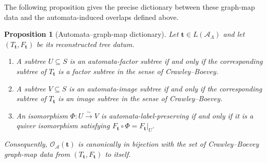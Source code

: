 \documentclass[11pt,a4paper]{amsart}
\theoremstyle{definition}
\theoremstyle{plain}
\newtheorem{proposition}[definition]{Proposition}
\theoremstyle{remark}
\numberwithin{equation}{section}
\begin{document}
The following proposition gives the precise dictionary between these graph-map data and the automata-induced overlaps defined above.

\begin{proposition}[Automata--graph-map dictionary]\label{prop:automata-graph-map-dictionary}
Let $\mathbf t\in L(\mathcal A_\Lambda)$ and let $(T_{\mathbf t},F_{\mathbf t})$ be its reconstructed tree datum.

\begin{enumerate}[label=\textup{(\roman*)}]
\item A subtree $U\subseteq S$ is an automata-factor subtree if and only if the corresponding subtree of $T_{\mathbf t}$ is a factor subtree in the sense of Crawley--Boevey.
\item A subtree $V\subseteq S$ is an automata-image subtree if and only if the corresponding subtree of $T_{\mathbf t}$ is an image subtree in the sense of Crawley--Boevey.
\item An isomorphism $\Phi:U\xrightarrow{\sim}V$ is automata-label-preserving if and only if it is a quiver isomorphism satisfying
$
F_{\mathbf t}\circ\Phi=F_{\mathbf t}|_U.
$
\end{enumerate}

Consequently, $\mathscr O_{\mathcal A}(\mathbf t)$ is canonically in bijection with the set of Crawley--Boevey graph-map data from $(T_{\mathbf t},F_{\mathbf t})$ to itself.
\end{proposition}
\end{document}
